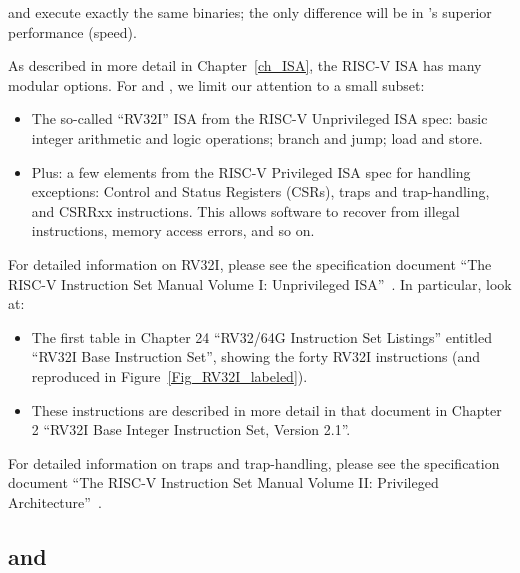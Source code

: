 {\DRUM} and {\FIFE} execute exactly the same binaries; the only difference
will be in {\FIFE}'s superior performance (speed).

As described in more detail in Chapter~\ref{ch_ISA}, the RISC-V ISA
has many modular options.  For {\DRUM} and {\FIFE}, we limit our attention
to a small subset:

\begin{itemize}
		  
 \item The so-called ``RV32I'' ISA from the RISC-V Unprivileged ISA
       spec: basic integer arithmetic and logic operations; branch and
       jump; load and store.

 \item Plus: a few elements from the RISC-V Privileged ISA spec for
       handling exceptions: Control and Status Registers (CSRs), traps
       and trap-handling, and CSRRxx instructions.  This allows
       software to recover from illegal instructions, memory access
       errors, and so on.

\end{itemize}

For detailed information on RV32I, please see the specification
document ``The RISC-V Instruction Set Manual Volume I: Unprivileged
ISA''~\cite{RISCV_Unpriv_2019_12_13}.  In particular, look at:

\begin{itemize}

 \item The first table in Chapter 24 ``RV32/64G Instruction Set
       Listings'' entitled ``RV32I Base Instruction Set'', showing the
       forty RV32I instructions (and reproduced in
       Figure~\ref{Fig_RV32I_labeled}).

 \item These instructions are described in more detail in that
       document in Chapter 2 ``RV32I Base Integer Instruction Set,
       Version 2.1''.

\end{itemize}

For detailed information on traps and trap-handling, please see the
specification document ``The RISC-V Instruction Set Manual Volume II:
Privileged Architecture''~\cite{RISCV_Priv_2021_12_03}.


\subsection{{\DRUM} and {\FIFE}}

